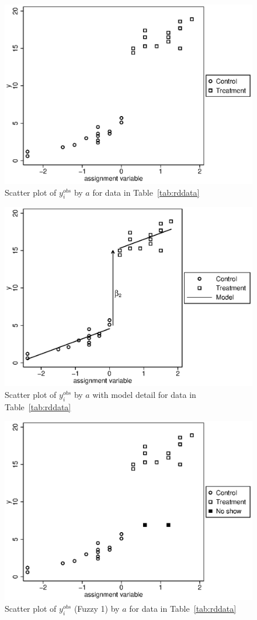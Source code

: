 \begin{figure}
   \centering
   \includegraphics[angle=0,
           width=.75\textwidth]{rd_scatter.eps}
   \caption{Scatter plot of $y_i^{obs}$ by $a$ for data in Table~\ref{tab:rddata}}
  \label{fig:rd_scatter}
\end{figure}

\begin{figure}
   \centering
   \includegraphics[angle=0,
           width=.75\textwidth]{rd_fit.eps}
   \caption{Scatter plot of $y_i^{obs}$ by $a$ with model detail for data in Table~\ref{tab:rddata}}
  \label{fig:rd_fit}
\end{figure}


\begin{figure}
   \centering
   \includegraphics[angle=0,
           width=.75\textwidth]{rd_t1.eps}
   \caption{Scatter plot of $y_i^{obs}$ (Fuzzy 1) by $a$ for data in Table~\ref{tab:rddata}}
  \label{fig:rd_t1}
\end{figure}

